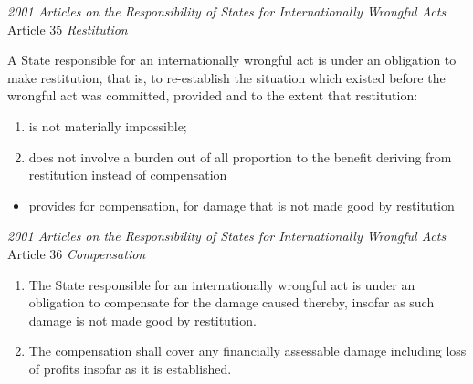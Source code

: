 \begin{conventiondetails}{\textit{2001 Articles on the Responsibility of States for Internationally Wrongful Acts} Article 35}
    \flushleft
    \textit{Restitution}

    \vspace{\baselineskip}

    A State responsible for an internationally wrongful act is under an obligation to make restitution, that is, to re-establish the situation which existed before the wrongful act was committed, provided and to the extent that restitution:

    \begin{enumerate}[label=(\alph*)]
        \item is not materially impossible;
        \item does not involve a burden out of all proportion to the benefit deriving from restitution instead of compensation
    \end{enumerate}
\end{conventiondetails}

\begin{itemize}
    \item {} provides for compensation, for damage that is not made good by restitution
\end{itemize}

\begin{conventiondetails}{\textit{2001 Articles on the Responsibility of States for Internationally Wrongful Acts} Article 36}
    \flushleft
    \textit{Compensation}

    \begin{enumerate}
        \item The State responsible for an internationally wrongful act is under an obligation to compensate for the damage caused thereby, insofar as such damage is not made good by restitution.
        \item The compensation shall cover any financially assessable damage including loss of profits insofar as it is established.
    \end{enumerate}
\end{conventiondetails}

